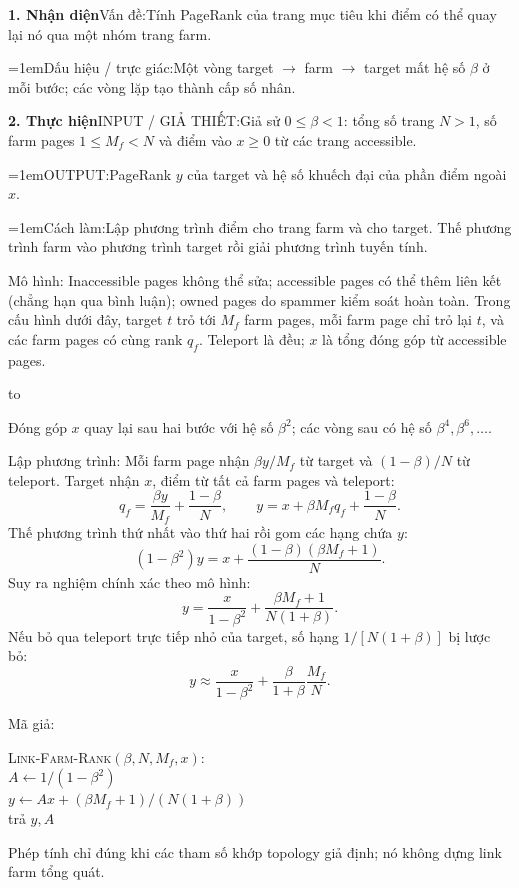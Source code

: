 \documentclass[10pt,a4paper,twocolumn]{article}
\makeatletter
\newcommand{\key}[1]{#1:\enspace}
\newenvironment{diagram}{%
  \par\addvspace{3pt}\noindent\hbox to \linewidth\bgroup\hfil
}{\hfil\egroup\par\addvspace{3pt}}
\newcommand{\algfield}[2]{\par\noindent\hangindent=1em\relax#1:\enspace#2}
\newcommand{\unitfield}[4]{%
  \par\noindent\textbf{#1. #2}\enspace #3:\enspace #4}
\newcommand{\algsummary}[6]{%
  \begingroup\setlength{\parskip}{1pt}%
  \unitfield{1}{Nhận diện}{Vấn đề}{#1}%
  \algfield{Dấu hiệu / trực giác}{#2}%
  \if\relax\detokenize{#3}\relax\else\par\noindent#3\par\fi%
  \unitfield{2}{Thực hiện}{INPUT / GIẢ THIẾT}{#4}%
  \algfield{OUTPUT}{#5}%
  \algfield{Cách làm}{#6}\par\endgroup}
\newenvironment{algpseudo}{%
  \par\addvspace{2pt}\noindent
  \setlength{\parskip}{0pt}%
  Mã giả:\par\nobreak
  \begin{list}{}{\setlength{\leftmargin}{1em}\setlength{\topsep}{0pt}%
    \setlength{\partopsep}{0pt}\setlength{\parsep}{0pt}%
    \@beginparpenalty=10000\relax}%
  \item\relax
}{\end{list}\par\addvspace{3pt}}
\makeatother
\begin{document}
\algsummary{Tính PageRank của trang mục tiêu khi điểm có thể quay lại nó qua một nhóm trang farm.}{Một vòng target $\to$ farm $\to$ target mất hệ số $\beta$ ở mỗi bước; các vòng lặp tạo thành cấp số nhân.}{}{Giả sử $0\le\beta<1$: tổng số trang $N>1$, số farm pages $1\le M_f<N$ và điểm vào $x\ge0$ từ các trang accessible.}{PageRank $y$ của target và hệ số khuếch đại của phần điểm ngoài $x$.}{Lập phương trình điểm cho trang farm và cho target. Thế phương trình farm vào phương trình target rồi giải phương trình tuyến tính.}

\key{Mô hình} Inaccessible pages không thể sửa; accessible pages có thể thêm liên kết (chẳng hạn qua bình luận); owned pages do spammer kiểm soát hoàn toàn. Trong cấu hình dưới đây, target $t$ trỏ tới $M_f$ farm pages, mỗi farm page chỉ trỏ lại $t$, và các farm pages có cùng rank $q_f$. Teleport là đều; $x$ là tổng đóng góp từ accessible pages.
\begin{diagram}
\end{diagram}
Đóng góp $x$ quay lại sau hai bước với hệ số $\beta^2$; các vòng sau có hệ số $\beta^4,\beta^6,\ldots$.

\key{Lập phương trình} Mỗi farm page nhận $\beta y/M_f$ từ target và $ (1-\beta)/N$ từ teleport. Target nhận $x$, điểm từ tất cả farm pages và teleport:
\[
q_f=\frac{\beta y}{M_f}+\frac{1-\beta}{N},\qquad
y=x+\beta M_fq_f+\frac{1-\beta}{N}.
\]
Thế phương trình thứ nhất vào thứ hai rồi gom các hạng chứa $y$:
\[
(1-\beta^2)y=x+\frac{(1-\beta)(\beta M_f+1)}{N}.
\]
Suy ra nghiệm chính xác theo mô hình:
\[
\boxed{y=\frac{x}{1-\beta^2}+\frac{\beta M_f+1}{N(1+\beta)}}.
\]
Nếu bỏ qua teleport trực tiếp nhỏ của target, số hạng $1/[N(1+\beta)]$ bị lược bỏ:
\[
y\approx\frac{x}{1-\beta^2}+\frac{\beta}{1+\beta}\frac{M_f}{N}.
\]

\begin{minipage}{\columnwidth}
\begin{algpseudo}
\textsc{Link-Farm-Rank}$(\beta,N,M_f,x)$:\\
\quad $A\gets1/(1-\beta^2)$\\
\quad $y\gets Ax+(\beta M_f+1)/(N(1+\beta))$\\
\quad trả $y,A$
\end{algpseudo}
\end{minipage}
Phép tính chỉ đúng khi các tham số khớp topology giả định; nó không dựng link farm tổng quát.
\end{document}
